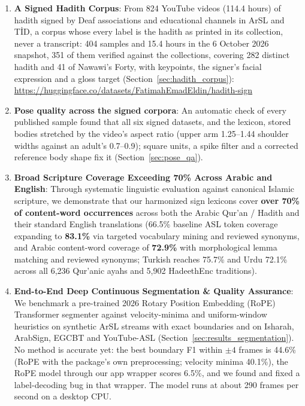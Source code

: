 \begin{enumerate}[leftmargin=*,itemsep=4pt]
  \item \textbf{A Signed Hadith Corpus}:
    From 824 YouTube videos (114.4 hours) of hadith signed by Deaf associations and educational channels in ArSL and
    T\.{I}D, a corpus whose every label is the hadith as printed in its collection, never a transcript: 404 samples and
    15.4 hours in the 6 October 2026 snapshot, 351 of them verified against the collections, covering 282 distinct
    hadith and 41 of Nawawi's Forty, with keypoints, the signer's facial expression and a gloss target
    (Section~\ref{sec:hadith_corpus}):\\
    \url{https://huggingface.co/datasets/FatimahEmadEldin/hadith-sign}

  \item \textbf{Pose quality across the signed corpora}:
    An automatic check of every published sample found that all six signed datasets, and the lexicon, stored bodies
    stretched by the video's aspect ratio (upper arm 1.25--1.44 shoulder widths against an adult's 0.7--0.9); square
    units, a spike filter and a corrected reference body shape fix it (Section~\ref{sec:pose_qa}).

  \item \textbf{Broad Scripture Coverage Exceeding 70\% Across Arabic and English}:
    Through systematic linguistic evaluation against canonical Islamic scripture, we demonstrate that our harmonized sign lexicons cover \textbf{over 70\% of content-word occurrences} across both the Arabic Qur'an / Hadith and their standard English translations (66.5\% baseline ASL token coverage expanding to \textbf{83.1\%} via targeted vocabulary mining and reviewed synonyms, and Arabic content-word coverage of \textbf{72.9\%} with morphological lemma matching and reviewed synonyms; Turkish reaches 75.7\% and Urdu 72.1\% across all 6,236 Qur'anic ayahs and 5,902 HadeethEnc traditions).

  \item \textbf{End-to-End Deep Continuous Segmentation \& Quality Assurance}:
    We benchmark a pre-trained 2026 Rotary Position Embedding (RoPE) Transformer segmenter against velocity-minima and uniform-window heuristics on synthetic ArSL streams with exact boundaries and on Isharah, ArabSign, EGCBT and YouTube-ASL (Section~\ref{sec:results_segmentation}). No method is accurate yet: the best boundary F1 within $\pm4$ frames is 44.6\% (RoPE with the package's own preprocessing; velocity minima 40.1\%), the RoPE model through our app wrapper scores 6.5\%, and we found and fixed a label-decoding bug in that wrapper. The model runs at about 290 frames per second on a desktop CPU.


\end{enumerate}
